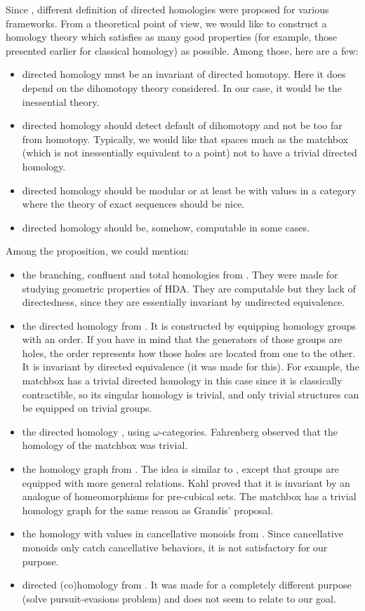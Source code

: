 Since \cite{goubault95}, different definition of directed homologies were proposed for various frameworks. From a theoretical point of view, we would like to construct a homology theory which satisfies as many good properties (for example, those presented earlier for classical homology) as possible. Among those, here are a few:
\begin{itemize}
	\item directed homology must be an invariant of directed homotopy. Here it does depend on the dihomotopy theory considered. In our case, it would be the inessential theory.
	\item directed homology should detect default of dihomotopy and not be too far from homotopy. Typically, we would like that spaces much as the matchbox (which is not inessentially equivalent to a point) not to have a trivial directed homology.
	\item directed homology should be modular or at least be with values in a category where the theory of exact sequences should be nice.
	\item directed homology should be, somehow, computable in some cases.
\end{itemize}

\noindent Among the proposition, we could mention:
\begin{itemize}
	\item the branching, confluent and total homologies from \cite{goubault95}. They were made for studying geometric properties of HDA. They are computable but they lack of directedness, since they are essentially invariant by undirected equivalence.
	\item the directed homology from \cite{grandis04}. It is constructed by equipping homology groups with an order. If you have in mind that the generators of those groups are holes, the order represents how those holes are located from one to the other. It is invariant by directed equivalence (it was made for this). For example, the matchbox has a trivial directed homology in this case since it is classically contractible, so its singular homology is trivial, and only trivial structures can be equipped on trivial groups.
	\item the directed homology \cite{fahrenberg03}, using $\omega$-categories. Fahrenberg observed that the homology of the matchbox was trivial.
	\item the homology graph from \cite{kahl14}. The idea is similar to \cite{grandis04}, except that groups are equipped with more general relations. Kahl proved that it is invariant by an analogue of homeomorphisms for pre-cubical sets. The matchbox has a trivial homology graph for the same reason as Grandis' proposal.
	\item the homology with values in cancellative monoids from \cite{patchkoria06}. Since cancellative monoids only catch cancellative behaviors, it is not satisfactory for our purpose.
	\item directed (co)homology from \cite{ghrist16}. It was made for a completely different purpose (solve pursuit-evasions problem) and does not seem to relate to our goal.
\end{itemize}





